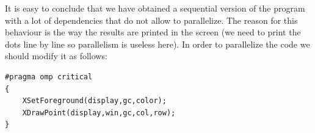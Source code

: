 \documentclass[12]{article}
\begin{document}
It is easy to conclude that we have obtained a sequential version of the program with a lot of dependencies that do not allow to parallelize. The reason for this behaviour is the way the results are printed in the screen (we need to print the dots line by line so parallelism is useless here). In order to parallelize the code we should modify it as follows: 
\begin{lstlisting}[frame=single]
#pragma omp critical
{
	XSetForeground(display,gc,color);
	XDrawPoint(display,win,gc,col,row);
}
\end{lstlisting}


%
%
%
%
\end{document}
